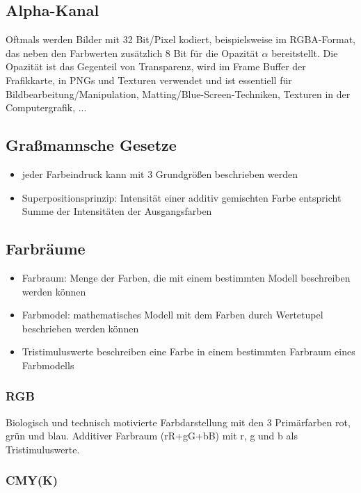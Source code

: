 \documentclass[paper=a4, fontsize=11pt]{scrartcl} %
\numberwithin{equation}{section} %
\numberwithin{figure}{section} %
\numberwithin{table}{section} %
\begin{document}
\subsection{Alpha-Kanal}

Oftmals werden Bilder mit 32 Bit/Pixel kodiert, beispielsweise im RGBA-Format, das neben den Farbwerten zusätzlich 8 Bit für die Opazität $\alpha$ bereitstellt. Die Opazität ist das Gegenteil von Transparenz, wird im Frame Buffer der Frafikkarte, in PNGs und Texturen verwendet und ist essentiell für Bildbearbeitung/Manipulation, Matting/Blue-Screen-Techniken, Texturen in der Computergrafik, ...

\subsection{Graßmannsche Gesetze}

\begin{itemize}
\item jeder Farbeindruck kann mit 3 Grundgrößen beschrieben werden
\item Superpositionsprinzip: Intensität einer additiv gemischten Farbe entspricht Summe der Intensitäten der Ausgangsfarben
\end{itemize}

\subsection{Farbräume}

\begin{itemize}
\item Farbraum: Menge der Farben, die mit einem bestimmten Modell beschreiben werden können
\item Farbmodel: mathematisches Modell mit dem Farben durch Wertetupel beschrieben werden können
\item Tristimuluswerte beschreiben eine Farbe in einem bestimmten Farbraum eines Farbmodells
\end{itemize}

\subsubsection{RGB}

Biologisch und technisch motivierte Farbdarstellung mit den 3 Primärfarben rot, grün und blau. Additiver Farbraum (rR+gG+bB) mit r, g und b als Tristimuluswerte. 

\subsubsection{CMY(K)}
\end{document}
